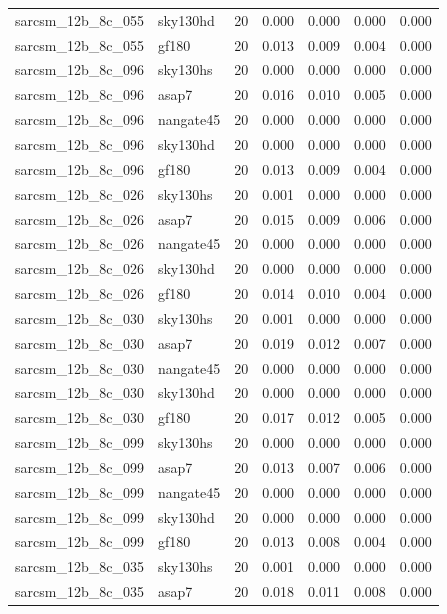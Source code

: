 \begin{tabular}{llrrrrr}
sarcsm\_12b\_8c\_055 & sky130hd & 20 & 0.000 & 0.000 & 0.000 & 0.000 \\
sarcsm\_12b\_8c\_055 & gf180 & 20 & 0.013 & 0.009 & 0.004 & 0.000 \\
sarcsm\_12b\_8c\_096 & sky130hs & 20 & 0.000 & 0.000 & 0.000 & 0.000 \\
sarcsm\_12b\_8c\_096 & asap7 & 20 & 0.016 & 0.010 & 0.005 & 0.000 \\
sarcsm\_12b\_8c\_096 & nangate45 & 20 & 0.000 & 0.000 & 0.000 & 0.000 \\
sarcsm\_12b\_8c\_096 & sky130hd & 20 & 0.000 & 0.000 & 0.000 & 0.000 \\
sarcsm\_12b\_8c\_096 & gf180 & 20 & 0.013 & 0.009 & 0.004 & 0.000 \\
sarcsm\_12b\_8c\_026 & sky130hs & 20 & 0.001 & 0.000 & 0.000 & 0.000 \\
sarcsm\_12b\_8c\_026 & asap7 & 20 & 0.015 & 0.009 & 0.006 & 0.000 \\
sarcsm\_12b\_8c\_026 & nangate45 & 20 & 0.000 & 0.000 & 0.000 & 0.000 \\
sarcsm\_12b\_8c\_026 & sky130hd & 20 & 0.000 & 0.000 & 0.000 & 0.000 \\
sarcsm\_12b\_8c\_026 & gf180 & 20 & 0.014 & 0.010 & 0.004 & 0.000 \\
sarcsm\_12b\_8c\_030 & sky130hs & 20 & 0.001 & 0.000 & 0.000 & 0.000 \\
sarcsm\_12b\_8c\_030 & asap7 & 20 & 0.019 & 0.012 & 0.007 & 0.000 \\
sarcsm\_12b\_8c\_030 & nangate45 & 20 & 0.000 & 0.000 & 0.000 & 0.000 \\
sarcsm\_12b\_8c\_030 & sky130hd & 20 & 0.000 & 0.000 & 0.000 & 0.000 \\
sarcsm\_12b\_8c\_030 & gf180 & 20 & 0.017 & 0.012 & 0.005 & 0.000 \\
sarcsm\_12b\_8c\_099 & sky130hs & 20 & 0.000 & 0.000 & 0.000 & 0.000 \\
sarcsm\_12b\_8c\_099 & asap7 & 20 & 0.013 & 0.007 & 0.006 & 0.000 \\
sarcsm\_12b\_8c\_099 & nangate45 & 20 & 0.000 & 0.000 & 0.000 & 0.000 \\
sarcsm\_12b\_8c\_099 & sky130hd & 20 & 0.000 & 0.000 & 0.000 & 0.000 \\
sarcsm\_12b\_8c\_099 & gf180 & 20 & 0.013 & 0.008 & 0.004 & 0.000 \\
sarcsm\_12b\_8c\_035 & sky130hs & 20 & 0.001 & 0.000 & 0.000 & 0.000 \\
sarcsm\_12b\_8c\_035 & asap7 & 20 & 0.018 & 0.011 & 0.008 & 0.000 \\

\end{tabular}
